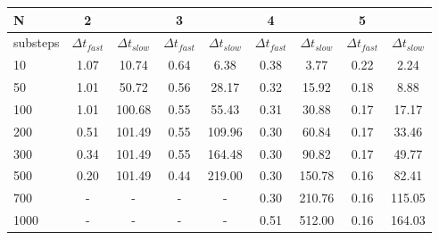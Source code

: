 \begin{tabular}{l|cc|cc|cc|cc}
N& 2  &  & 3  &  & 4  &  & 5  &  \\
\hline
substeps& $\Delta t_{fast}$  & $\Delta t_{slow}$& $\Delta t_{fast}$  & $\Delta t_{slow}$& $\Delta t_{fast}$  & $\Delta t_{slow}$& $\Delta t_{fast}$  & $\Delta t_{slow}$\\
\hline
10& 1.07 & 10.74 & 0.64 & 6.38 & 0.38 & 3.77 & 0.22 & 2.24 \\
50& 1.01 & 50.72 & 0.56 & 28.17 & 0.32 & 15.92 & 0.18 & 8.88 \\
100& 1.01 & 100.68 & 0.55 & 55.43 & 0.31 & 30.88 & 0.17 & 17.17 \\
200& 0.51 & 101.49 & 0.55 & 109.96 & 0.30 & 60.84 & 0.17 & 33.46 \\
300& 0.34 & 101.49 & 0.55 & 164.48 & 0.30 & 90.82 & 0.17 & 49.77 \\
500& 0.20 & 101.49 & 0.44 & 219.00 & 0.30 & 150.78 & 0.16 & 82.41 \\
700&   -  &   -    &   -  &   -  &  0.30 & 210.76 & 0.16 & 115.05 \\
1000&   -  &   -    &   -  &   -  &  0.51 & 512.00 & 0.16 & 164.03 \\
\hline
\end{tabular}
